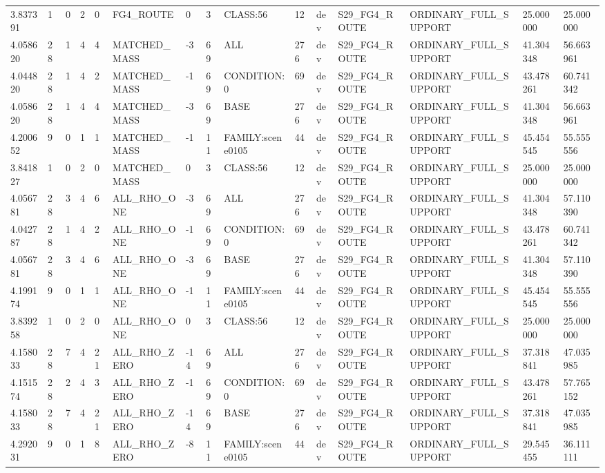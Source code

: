 \begin{tabular}{lllllllllllllll}
3.837391 & 1 & 0 & 2 & 0 & FG4\_ROUTE & 0 & 3 & CLASS:56 & 12 & dev & S29\_FG4\_ROUTE & ORDINARY\_FULL\_SUPPORT & 25.000000 & 25.000000 \\
4.058620 & 28 & 1 & 4 & 4 & MATCHED\_MASS & -3 & 69 & ALL & 276 & dev & S29\_FG4\_ROUTE & ORDINARY\_FULL\_SUPPORT & 41.304348 & 56.663961 \\
4.044820 & 28 & 1 & 4 & 2 & MATCHED\_MASS & -1 & 69 & CONDITION:0 & 69 & dev & S29\_FG4\_ROUTE & ORDINARY\_FULL\_SUPPORT & 43.478261 & 60.741342 \\
4.058620 & 28 & 1 & 4 & 4 & MATCHED\_MASS & -3 & 69 & BASE & 276 & dev & S29\_FG4\_ROUTE & ORDINARY\_FULL\_SUPPORT & 41.304348 & 56.663961 \\
4.200652 & 9 & 0 & 1 & 1 & MATCHED\_MASS & -1 & 11 & FAMILY:scene0105 & 44 & dev & S29\_FG4\_ROUTE & ORDINARY\_FULL\_SUPPORT & 45.454545 & 55.555556 \\
3.841827 & 1 & 0 & 2 & 0 & MATCHED\_MASS & 0 & 3 & CLASS:56 & 12 & dev & S29\_FG4\_ROUTE & ORDINARY\_FULL\_SUPPORT & 25.000000 & 25.000000 \\
4.056781 & 28 & 3 & 4 & 6 & ALL\_RHO\_ONE & -3 & 69 & ALL & 276 & dev & S29\_FG4\_ROUTE & ORDINARY\_FULL\_SUPPORT & 41.304348 & 57.110390 \\
4.042787 & 28 & 1 & 4 & 2 & ALL\_RHO\_ONE & -1 & 69 & CONDITION:0 & 69 & dev & S29\_FG4\_ROUTE & ORDINARY\_FULL\_SUPPORT & 43.478261 & 60.741342 \\
4.056781 & 28 & 3 & 4 & 6 & ALL\_RHO\_ONE & -3 & 69 & BASE & 276 & dev & S29\_FG4\_ROUTE & ORDINARY\_FULL\_SUPPORT & 41.304348 & 57.110390 \\
4.199174 & 9 & 0 & 1 & 1 & ALL\_RHO\_ONE & -1 & 11 & FAMILY:scene0105 & 44 & dev & S29\_FG4\_ROUTE & ORDINARY\_FULL\_SUPPORT & 45.454545 & 55.555556 \\
3.839258 & 1 & 0 & 2 & 0 & ALL\_RHO\_ONE & 0 & 3 & CLASS:56 & 12 & dev & S29\_FG4\_ROUTE & ORDINARY\_FULL\_SUPPORT & 25.000000 & 25.000000 \\
4.158033 & 28 & 7 & 4 & 21 & ALL\_RHO\_ZERO & -14 & 69 & ALL & 276 & dev & S29\_FG4\_ROUTE & ORDINARY\_FULL\_SUPPORT & 37.318841 & 47.035985 \\
4.151574 & 28 & 2 & 4 & 3 & ALL\_RHO\_ZERO & -1 & 69 & CONDITION:0 & 69 & dev & S29\_FG4\_ROUTE & ORDINARY\_FULL\_SUPPORT & 43.478261 & 57.765152 \\
4.158033 & 28 & 7 & 4 & 21 & ALL\_RHO\_ZERO & -14 & 69 & BASE & 276 & dev & S29\_FG4\_ROUTE & ORDINARY\_FULL\_SUPPORT & 37.318841 & 47.035985 \\
4.292031 & 9 & 0 & 1 & 8 & ALL\_RHO\_ZERO & -8 & 11 & FAMILY:scene0105 & 44 & dev & S29\_FG4\_ROUTE & ORDINARY\_FULL\_SUPPORT & 29.545455 & 36.111111 \\

\end{tabular}
